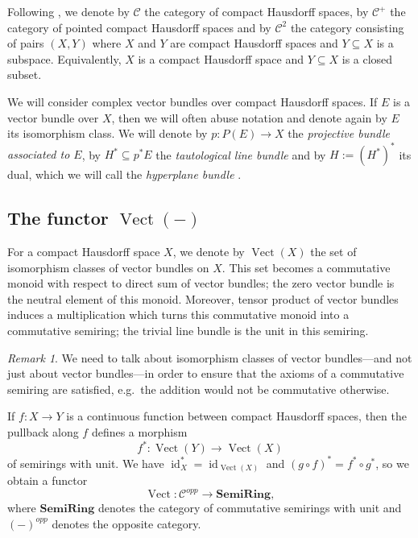 \documentclass[12pt,a4paper]{amsart}
\theoremstyle{plain}
\theoremstyle{definition}
\theoremstyle{remark}
\newtheorem{rem}[thm]{Remark}
\begin{document}
Following \cite[p.~66]{ati67}, we denote by $\mathcal{C}$ the category of compact Hausdorff spaces, by $\mathcal{C}^{+}$ the category of pointed compact Hausdorff spaces and by $\mathcal{C}^{2}$ the category consisting of pairs $(X,Y)$ where $X$ and $Y$ are compact Hausdorff spaces and $Y \subseteq X$ is a subspace.
Equivalently, $X$ is a compact Hausdorff space and $Y \subseteq X$ is a closed subset.

We will consider complex vector bundles over compact Hausdorff spaces.
If $E$ is a vector bundle over $X$, then we will often abuse notation and denote again by $E$ its isomorphism class.
We will denote by $p \colon P(E) \to X$ the \textit{projective bundle associated to $E$}, by $H^{*} \subseteq p^{*}E$ the \textit{tautological line bundle} and by $H := (H^{*})^{*}$ its dual, which we will call the \textit{hyperplane bundle} \cite[p.~45]{ati67}.

\subsection{The functor $\operatorname{Vect}(-)$}

For a compact Hausdorff space $X$, we denote by $\operatorname{Vect}(X)$ the set of isomorphism classes of vector bundles on $X$.
This set becomes a commutative monoid with respect to direct sum of vector bundles; the zero vector bundle is the neutral element of this monoid.
Moreover, tensor product of vector bundles induces a multiplication which turns this commutative monoid into a commutative semiring; the trivial line bundle is the unit in this semiring.

\begin{rem}
  We need to talk about isomorphism classes of vector bundles---and not just about vector bundles---in order to ensure that the axioms of a commutative semiring are satisfied, e.g.~the addition would not be commutative otherwise.
\end{rem}

If $f \colon X \to Y$ is a continuous function between compact Hausdorff spaces, then the pullback along $f$ defines a morphism
\[ f^{*} \colon \operatorname{Vect}(Y) \to \operatorname{Vect}(X) \]
of semirings with unit.
We have $\operatorname{id}_{X}^{*} = \operatorname{id}_{\operatorname{Vect}(X)}$ and $(g \circ f)^{*} = f^{*} \circ g^{*}$, so we obtain a functor
\[ \operatorname{Vect} \colon \mathcal{C}^{opp} \to \mathbf{SemiRing}, \]
where $\mathbf{SemiRing}$ denotes the category of commutative semirings with unit and $(-)^{opp}$ denotes the opposite category.
\end{document}
